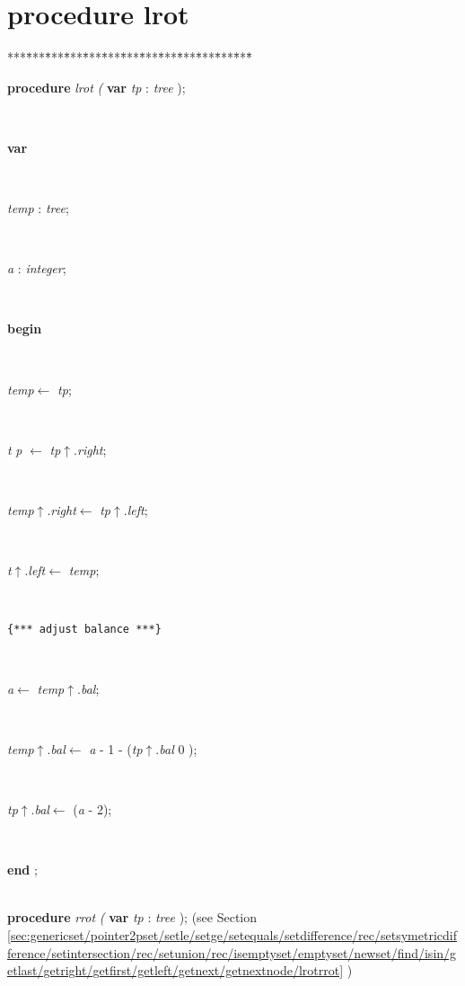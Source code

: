 \documentclass[10pt, a4paper]{article}
\begin{document}
\section{procedure lrot}\label{sec:genericset/pointer2pset/setle/setge/setequals/setdifference/rec/setsymetricdifference/setintersection/rec/setunion/rec/isemptyset/emptyset/newset/find/isin/getlast/getright/getfirst/getleft/getnext/getnextnodelrot}

\begin{tabbing}
***\=***\=***\=***\=***\=***\=***\=***\=***\=***\=***\=***\=***\=\kill
\parbox{14cm}{\textsf {\textbf {procedure } \textsf{ \textit{lrot} \textit{(}  } \textbf{ var } \textsf{ \textit{tp}  : \textit{tree}  );}}}\\
\+\parbox{14cm}{\textsf{\textbf{var} }}\\
\parbox{14cm}{\textsf{\textit{temp} : \textit{tree}}; }\\
\parbox{14cm}{\textsf{\textit{a} : \textit{integer}}; }\\
\-\<\+\parbox{14cm}{\textsf{\textbf{begin} }}\\
\parbox{14cm}{\textsf{\textit{temp}$\leftarrow$ \textit{tp}}; }\\
\parbox{14cm}{\textsf{\textit{t}  \textit{p} $\leftarrow$ \textit{tp}$\uparrow$.\textit{right}}; }\\
\parbox{14cm}{\textsf{\textit{temp}$\uparrow$.\textit{right}$\leftarrow$ \textit{tp}$\uparrow$.\textit{left}}; }\\
\parbox{14cm}{\textsf{\textit{t}$\uparrow$.\textit{left}$\leftarrow$ \textit{temp}}; }\\
\parbox{14cm}{\texttt{\small{\{*** adjust balance ***\}}}}\\
\parbox{14cm}{\textsf{\textit{a}$\leftarrow$ \textit{temp}$\uparrow$.\textit{bal}}; }\\
\parbox{14cm}{\textsf{\textit{temp}$\uparrow$.\textit{bal}$\leftarrow$ \textit{a} - 1 - (\textit{tp}$\uparrow$.\textit{bal}  0 )}; }\\
\parbox{14cm}{\textsf{\textit{tp}$\uparrow$.\textit{bal}$\leftarrow$ (\textit{a} - 2)}; }\\
\<\-\parbox{14cm}{\textsf{\textbf{end} ;}}\\
\+\textsf{\textbf{procedure}  \textit{rrot} \textit{(}  \textbf{var}  \textit{tp}  : \textit{tree}  );} (see Section \ref{sec:genericset/pointer2pset/setle/setge/setequals/setdifference/rec/setsymetricdifference/setintersection/rec/setunion/rec/isemptyset/emptyset/newset/find/isin/getlast/getright/getfirst/getleft/getnext/getnextnode/lrotrrot} )\\
\end{tabbing}
\end{document}
